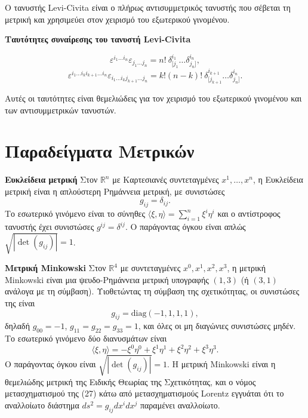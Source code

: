 \documentclass[12pt]{article}
\begin{document}
Ο τανυστής Levi-Civita είναι ο πλήρως αντισυμμετρικός τανυστής που σέβεται τη μετρική και χρησιμεύει στον χειρισμό του εξωτερικού γινομένου.

\textbf{Ταυτότητες συναίρεσης του τανυστή Levi-Civita}

\begin{equation}
\varepsilon^{i_1 \dots i_n} \varepsilon_{j_1 \dots j_n} = n! \ \delta^{i_1}_{[j_1} \dots \delta^{i_n}_{j_n]}, \tag{32}
\end{equation}
\begin{equation}
\varepsilon^{i_1 \dots i_k i_{k+1} \dots i_n} \varepsilon_{i_1 \dots i_k j_{k+1} \dots j_n} = k! (n-k)! \ \delta^{i_{k+1}}_{[j_{k+1}} \dots \delta^{i_n}_{j_n]}. \tag{33}
\end{equation}

Αυτές οι ταυτότητες είναι θεμελιώδεις για τον χειρισμό του εξωτερικού γινομένου και των αντισυμμετρικών τανυστών.

\section{Παραδείγματα Μετρικών}

\textbf{Ευκλείδεια μετρική}  
Στον \( \mathbb{R}^n \) με Καρτεσιανές συντεταγμένες \( x^1, \dots, x^n \), η Ευκλείδεια μετρική είναι η απλούστερη Ρημάννεια μετρική, με συνιστώσες
\begin{equation}
g_{ij} = \delta_{ij}. \tag{34}
\end{equation}
Το εσωτερικό γινόμενο είναι το σύνηθες \( \langle \xi, \eta \rangle = \sum_{i=1}^n \xi^i \eta^i \) και ο αντίστροφος τανυστής έχει συνιστώσες \( g^{ij} = \delta^{ij} \). Ο παράγοντας όγκου είναι απλώς \( \sqrt{|\det(g_{ij})|} = 1 \).

\textbf{Μετρική Minkowski}  
Στον \( \mathbb{R}^4 \) με συντεταγμένες \( x^0, x^1, x^2, x^3 \), η μετρική Minkowski είναι μια ψευδο-Ρημάννεια μετρική υπογραφής \( (1,3) \) (ή \( (3,1) \) ανάλογα με τη σύμβαση). Υιοθετώντας τη σύμβαση της σχετικότητας, οι συνιστώσες της είναι
\begin{equation}
g_{ij} = \text{diag}(-1, 1, 1, 1), \tag{35}
\end{equation}
δηλαδή \( g_{00} = -1 \), \( g_{11} = g_{22} = g_{33} = 1 \), και όλες οι μη διαγώνιες συνιστώσες μηδέν. Το εσωτερικό γινόμενο δύο διανυσμάτων είναι
\begin{equation}
\langle \xi, \eta \rangle = -\xi^0 \eta^0 + \xi^1 \eta^1 + \xi^2 \eta^2 + \xi^3 \eta^3.
\end{equation}
Ο παράγοντας όγκου είναι \( \sqrt{|\det(g_{ij})|} = 1 \). Η μετρική Minkowski είναι η θεμελιώδης μετρική της Ειδικής Θεωρίας της Σχετικότητας, και ο νόμος μετασχηματισμού της (27) κάτω από μετασχηματισμούς Lorentz εγγυάται ότι το αναλλοίωτο διάστημα \( ds^2 = g_{ij} dx^i dx^j \) παραμένει αναλλοίωτο.
\end{document}
